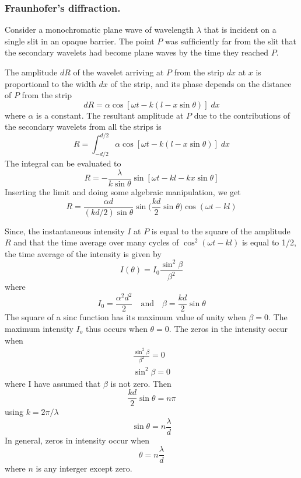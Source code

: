\documentclass[../../../main.tex]{subfiles}
\begin{document}
\subsubsection*{Fraunhofer's diffraction.} Consider a monochromatic plane wave of wavelength $\lambda$ that is incident on a single slit in an opaque barrier. The point $P$ was sufﬁciently far from the slit that the secondary wavelets had become plane waves by the time they reached $P$.

The amplitude $dR$ of the wavelet arriving at $P$ from the strip $dx$ at $x$ is proportional to the width $dx$ of the strip, and its phase depends on the distance of $P$ from the strip
\begin{equation*}
    dR=\alpha \cos[\omega t- k(l-x\sin \theta)]\;dx
\end{equation*}
where $\alpha$ is a constant. The resultant amplitude at $P$ due to the contributions of the secondary 
wavelets from all the strips is
\begin{equation*}
    R=\int_{-d/2}^{d/2}\alpha \cos[\omega t- k(l-x\sin \theta)]\;dx
\end{equation*}
The integral can be evaluated to 
\begin{equation*}
    R=-\frac{\lambda }{k\sin\theta}\sin[\omega t -k l -kx\sin\theta]
\end{equation*}
Inserting the limit and doing some algebraic manipulation, we get 
\begin{equation*}
    R=\frac{\alpha d}{(kd/2)\sin \theta}\sin \biggl(\frac{kd}{2}\sin\theta\biggr)\cos (\omega t-kl)
\end{equation*}

Since, the instantaneous intensity $I$ at $P$ is equal to the square of the amplitude $R$ and that the time average over many cycles of $\cos^2(\omega t - kl)$ is equal to 1/2, the time average of the intensity is given by
\begin{equation*}
    I(\theta)=I_0\frac{\sin^2 \beta}{\beta^2}
\end{equation*}
where 
\begin{equation*}
    I_0=\frac{\alpha^2d^2}{2}\quad\text{and}\quad\beta=\frac{kd}{2}\sin\theta
\end{equation*}
The square of a sinc function has its maximum value of unity when $\beta = 0$. The maximum intensity $I_o$ thus occurs when $\theta = 0$. The zeros in the intensity occur when
\begin{align*}
    \frac{\sin^2 \beta}{\beta^2}=0\\
    \sin^2 \beta=0
\end{align*}
where I have assumed that $\beta$ is not zero. Then 
\begin{equation*}
    \frac{kd}{2}\sin\theta=n\pi
\end{equation*}
using $k = 2\pi/\lambda$
\begin{equation*}
    \sin\theta=n\frac{\lambda}{d}
\end{equation*}
In general, zeros in intensity occur when
\begin{equation*}
    \theta=n\frac{\lambda}{d}
\end{equation*}
where $n$ is any interger except zero.
\end{document}
